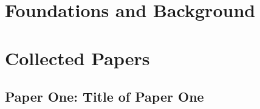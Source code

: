 \documentclass[%
  11pt,               %
  a4paper,            %
  twoside,            %
  openright,          %
  titlepage,          %
  headinclude,        %
  footinclude,        %
  BCOR=5mm,           %
  DIV=calc,           %
  numbers=noenddot    %
]{scrreprt}
\begin{document}
%




\cleardoublepage
\cleardoublepage
\cleardoublepage
\pagestyle{scrheadings} %
\cleardoublepage

\cleardoublepage
\pagestyle{scrheadings}
\cleardoublepage
\part{Foundations and Background}\label{pt:foundations}





\part{Collected Papers}\label{pt:collectedpapers}

\chapter{Paper One: Title of Paper One}
\lipsum[3-4] %
\end{document}
